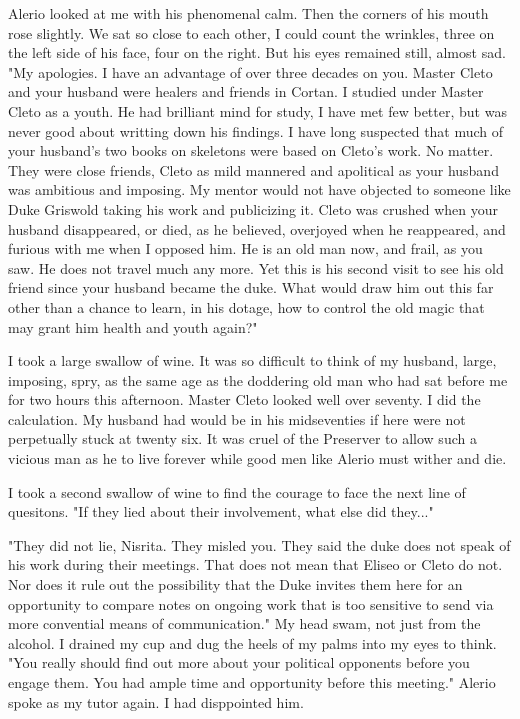\documentclass{article}
\begin{document}
Alerio looked at me with his phenomenal calm. Then the corners of his mouth rose slightly. We sat so close to each other, I could count the wrinkles, three  on the left side of his face, four on the right. But his eyes remained still, almost sad. "My apologies. I have an advantage of over three decades on you. Master Cleto and your husband were healers and friends in Cortan. I studied under Master Cleto as a youth. He had brilliant mind for study, I have met few better, but was never good about writting down his findings. I have long suspected that much of your husband's two books on skeletons were based on Cleto's work. No matter. They were close friends, Cleto as mild mannered and apolitical as your husband was ambitious and imposing. My mentor would not have objected to someone like Duke Griswold taking his work and publicizing it. Cleto was crushed when your husband disappeared, or died, as he believed, overjoyed when he reappeared, and furious with me when I opposed him. He is an old man now, and frail, as you saw. He does not travel much any more. Yet this is his second visit to see his old friend since your husband became the duke. What would draw him out this far other than a chance to learn, in his dotage, how to control the old magic that may grant him health and youth again?"

I took a large swallow of wine. It was so difficult to think of my husband, large, imposing, spry, as the same age as the doddering old man who had sat before me for two hours this afternoon. Master Cleto looked well over seventy. I did the calculation. My husband had would be in his midseventies if here were not perpetually stuck at twenty six. It was cruel of the Preserver to allow such a vicious man as he to live forever while good men like Alerio must wither and die. 

I took a second swallow of wine to find the courage to face the next line of quesitons. "If they lied about their involvement, what else did they..."

"They did not lie, Nisrita. They misled you. They said the duke does not speak of his work during their meetings. That does not mean that Eliseo or Cleto do not. Nor does it rule out the possibility that the Duke invites them here for an opportunity to compare notes on ongoing work that is too sensitive to send via more convential means of communication." My head swam, not just from the alcohol. I drained my cup and dug the heels of my palms into my eyes to think. "You really should find out more about your political opponents before you engage them. You had ample time and opportunity before this meeting." Alerio spoke as my tutor again. I had disppointed him.
\end{document}
